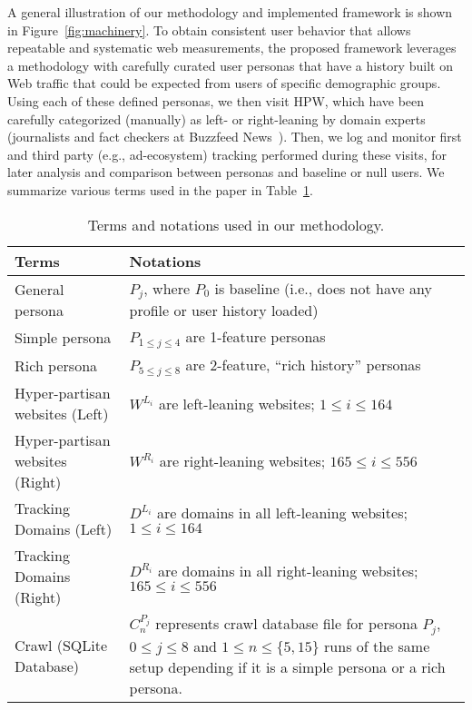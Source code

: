 \documentclass{article}
\newcommand{\hpw}{HPW\xspace}
\begin{document}
A general illustration of our methodology and implemented framework is shown in Figure~\ref{fig:machinery}.
To obtain consistent user behavior that allows repeatable and systematic web measurements, the proposed framework leverages a methodology with carefully curated user personas that have a history built on Web traffic that could be expected from users of specific demographic groups.
Using each of these defined personas, we then visit \hpw, which have been carefully categorized (manually) as left- or right-leaning by domain experts (journalists and fact checkers at Buzzfeed News~\cite{Buzzfeed,BuzzfeedGithub}).
Then, we log and monitor first and third party (e.g., ad-ecosystem) tracking performed during these visits, for later analysis and comparison between personas and baseline or null users.
We summarize various terms used in the paper in Table~\ref{table:notations}.



\begin{table}
    \centering
    \caption{Terms and notations used in our methodology.}
    \begin{tabular}{p{4.4cm}p{12cm}} 
        \toprule
        Terms&Notations\\
        \midrule
        General persona			& $P_j$, where $P_0$ is baseline (i.e., does not have any profile or user history loaded)\\
        Simple persona				& $P_{1\leq j \leq 4}$ are 1-feature personas\\
        Rich persona				& $P_{5\leq j \leq 8}$ are 2-feature, ``rich history'' personas \\
        \midrule
        Hyper-partisan websites (Left)		& $W^{L_i}$ are left-leaning websites; $1\leq i \leq 164$ \\
        Hyper-partisan websites (Right)	& $W^{R_i}$ are right-leaning websites; $165 \leq i \leq 556$ \\
        \midrule
        Tracking Domains (Left)		& $D^{L_i}$ are domains in all left-leaning websites; $1\leq i \leq 164$ \\
        Tracking Domains (Right)		& $D^{R_i}$ are domains in all right-leaning websites; $165 \leq i \leq 556$ \\
        \midrule
        Crawl (SQLite Database)		& $C^{P_j}_n$ represents crawl database file for persona $P_j$, $0\leq j \leq 8$ and $1\leq n \leq \{5, 15\} $ runs of the same setup depending if it is a simple persona or a rich persona.\\
        \bottomrule
    \end{tabular}
    \label{table:notations}
\end{table}
\end{document}
